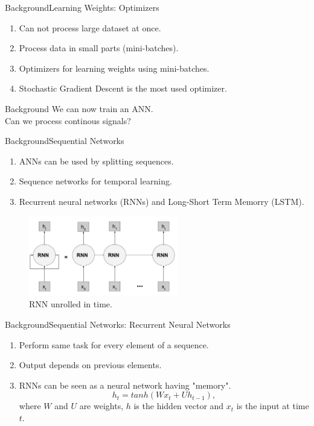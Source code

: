 \documentclass[handout]{beamer}
\begin{document}
\begin{frame}{Background}{Learning Weights: Optimizers}
  \begin{enumerate}
    \item Can not process large dataset at once.
    \item Process data in small parts (mini-batches).
    \item Optimizers for learning weights using mini-batches.
    \item Stochastic Gradient Descent is the most used optimizer.
  \end{enumerate}
\end{frame}

\begin{frame}{{Background}}
  \center
  \Large{\color{blue}We can now train an ANN. \\
  Can we process continous signals?}
\end{frame}

\begin{frame}{Background}{Sequential Networks}
  \begin{enumerate}
    \item ANNs can be used by splitting sequences.
    \item Sequence networks for temporal learning.
    \item Recurrent neural networks (RNNs) and Long-Short Term Memorry (LSTM).
  \end{enumerate}
  \begin{center}
    \begin{figure}
    \includegraphics[width=0.6\linewidth, height=3.5cm]{images/RNN}
    \caption{RNN unrolled in time.}
    \end{figure}
  \end{center}
\end{frame}

\begin{frame}{Background}{Sequential Networks: Recurrent Neural Networks}
  \begin{enumerate}
    \item Perform same task for every element of a sequence.
    \item Output depends on previous elements.
    \item RNNs can be seen as a neural network having "memory".
    \begin{equation}
        h_t = tanh(Wx_t+Uh_{t-1}),
    \end{equation}
    where $W$ and $U$ are weights, $h$ is the hidden vector and $x_t$ is the input at time $t$.
  \end{enumerate}

\end{frame}
\end{document}
